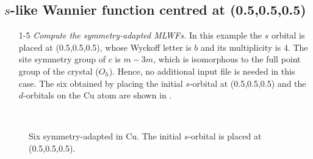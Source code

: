 \subsection*{$s$-like Wannier function centred at (0.5,0.5,0.5)}
\begin{itemize}
	\item [1-5] {\it Compute the symmetry-adapted MLWFs.}
	In this example the $s$ orbital is placed at (0.5,0.5,0.5), whose Wyckoff letter is $b$ and its multiplicity is $4$. The site symmetry group of $c$ is $m{-}3m$, which is  isomorphous to the full point group of the crystal ($O_h$). Hence, no additional input file is needed in this case.
	The six \MLWFs{} obtained by placing the initial $s$-orbital at (0.5,0.5,0.5) and the $d$-orbitals on the Cu atom are shown in .  	
\end{itemize}
\begin{figure}[h!]
	\centering
	\centering
	\centering
	\\
	\centering
	\centering
	\centering
	\caption{Six symmetry-adapted \MLWFs{} in Cu. The initial $s$-orbital is placed at (0.5,0.5,0.5).}
	\label{fig22.3}
	\end{figure}

